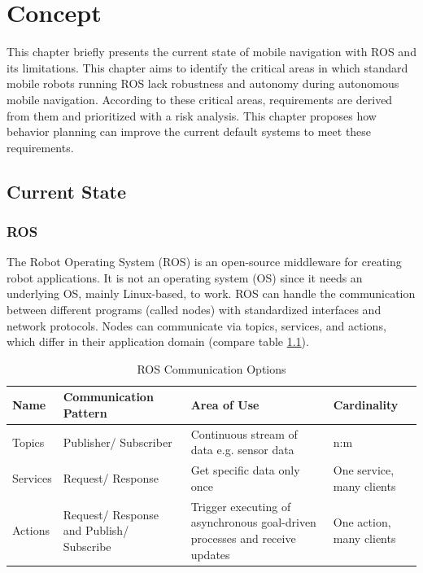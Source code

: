 \chapter{Concept}
\label{cha:methoden}

This chapter briefly presents the current state of mobile navigation with ROS and its limitations. 
This chapter aims to identify the critical areas in which standard mobile robots running ROS lack robustness and autonomy during autonomous mobile navigation. According to these critical areas, requirements are derived from them and prioritized with a risk analysis. 
This chapter proposes how behavior planning can improve the current default systems to meet these requirements. 

\section{Current State}
\subsection{ROS}
The Robot Operating System (ROS) is an open-source middleware for creating robot applications. It is not an operating system (OS) since it needs an underlying OS, mainly Linux-based, to work. 
ROS can handle the communication between different programs (called nodes) with standardized interfaces and network protocols. Nodes can communicate via topics, services, and actions, which differ in their application domain (compare table \ref{tab:ros_interfaces}). 

\begin{table}[ht]
	\caption{ROS Communication Options}
	\label{tab:ros_interfaces}
	\begin{tabular}{ | m{} | m{}| m{} | m{}|} 
  	\hline
  	\textbf{Name} & \textbf{Communication Pattern} & \textbf{Area of Use} & \textbf{Cardinality} \\ 
  	\hline
  	Topics & Publisher/ Subscriber & Continuous stream of data e.g. sensor data &  n:m \\ 
  	\hline
  	Services & Request/ Response & Get specific data only once & One service, many clients \\ 
  	\hline
  	Actions & Request/ Response and Publish/ Subscribe & Trigger executing of asynchronous goal-driven processes and receive updates & One action, many clients \\
  	\hline
	\end{tabular}
\end{table}

